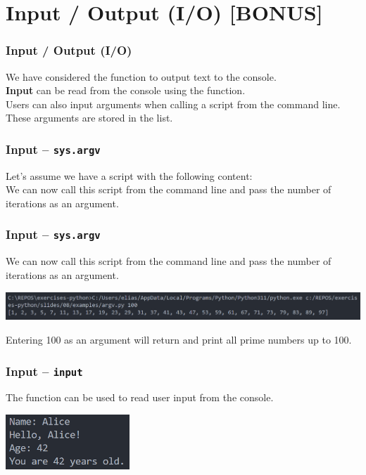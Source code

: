 \documentclass{beamer}
\begin{document}
\section{Input / Output (I/O) [BONUS]}
\begin{frame}
  \frametitle{Input / Output (I/O)}
  We have considered the \texttt{} function to output text to the console.\\
  \vspace{5mm}
  \textbf{Input} can be read from the console using the \texttt{} function.\\
  \vspace{5mm}
  Users can also input arguments when calling a script from the command line. These arguments are stored in the \texttt{} list.\\
\end{frame}
\begin{frame}
  \frametitle{Input -- \texttt{sys.argv}}
  Let's assume we have a script with the following content:\\
  
  We can now call this script from the command line and pass the number of iterations as an argument. 
\end{frame}
\begin{frame}
  \frametitle{Input -- \texttt{sys.argv}}
  We can now call this script from the command line and pass the number of iterations as an argument. 
  \begin{center}
    \includegraphics[width=\textwidth]{examples/fig/primes.png}
  \end{center}
  Entering 100 as an argument will return and print all prime numbers up to 100.
\end{frame}

\begin{frame}
  \frametitle{Input -- \texttt{input}}
  The \texttt{} function can be used to read user input from the console.\\
  
  \begin{center}
    \includegraphics[width=0.35\textwidth]{examples/fig/input.png}
  \end{center}
\end{frame}
\end{document}
